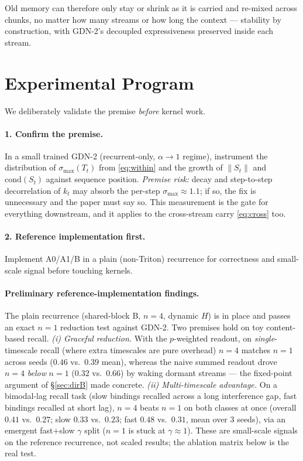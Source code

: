 \documentclass[11pt,letterpaper,logo]{yalearxiv}
\newcommand{\smax}{\sigma_{\max}}
\newcommand{\Tcarry}{T}                        %
\begin{document}
Old memory can therefore only stay or shrink as it is carried and re-mixed across chunks,
no matter how many streams or how long the context --- stability by construction, with
GDN-2's decoupled expressiveness preserved inside each stream.


\section{Experimental Program}
\label{sec:exp}

We deliberately validate the premise \emph{before} kernel work.

\paragraph{1. Confirm the premise.} In a small trained GDN-2 (recurrent-only,
$\alpha\to1$ regime), instrument the distribution of $\smax(\Tcarry_t)$ from
\eqref{eq:within} and the growth of $\|S_t\|$ and $\mathrm{cond}(S_t)$ against sequence
position. \emph{Premise risk:} decay and step-to-step decorrelation of $k_t$ may absorb the
per-step $\smax\approx1.1$; if so, the fix is unnecessary and the paper must say so. This
measurement is the gate for everything downstream, and it applies to the cross-stream carry
\eqref{eq:cross} too.

\paragraph{2. Reference implementation first.} Implement A0/A1/B in a plain (non-Triton)
recurrence for correctness and small-scale signal before touching kernels.

\paragraph{Preliminary reference-implementation findings.} The plain recurrence
(shared-block B, $n{=}4$, dynamic $H$) is in place and passes an exact $n{=}1$ reduction
test against GDN-2. Two premises hold on toy content-based recall. \emph{(i) Graceful
reduction.} With the $p$-weighted readout, on \emph{single}-timescale recall (where extra
timescales are pure overhead) $n{=}4$ matches $n{=}1$ across seeds ($0.46$ vs.\ $0.39$ mean),
whereas the naive summed readout drove $n{=}4$ \emph{below} $n{=}1$ ($0.32$ vs.\ $0.66$) by
waking dormant streams --- the fixed-point argument of \S\ref{sec:dirB} made concrete.
\emph{(ii) Multi-timescale advantage.} On a bimodal-lag recall task (slow bindings recalled
across a long interference gap, fast bindings recalled at short lag), $n{=}4$ beats $n{=}1$
on both classes at once (overall $0.41$ vs.\ $0.27$; slow $0.33$ vs.\ $0.23$; fast $0.48$
vs.\ $0.31$, mean over 3 seeds), via an emergent fast$+$slow $\gamma$ split ($n{=}1$ is stuck
at $\gamma{\approx}1$). These are small-scale signals on the reference recurrence, not scaled
results; the ablation matrix below is the real test.
\end{document}
